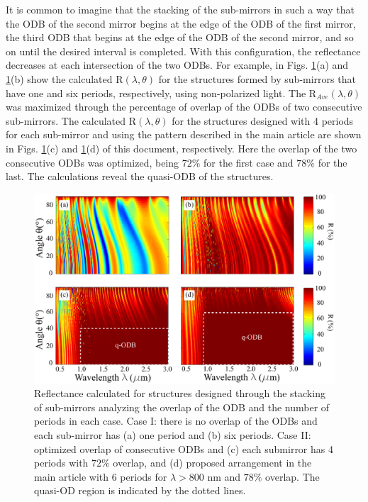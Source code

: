 \documentclass[a4paper,fleqn]{cas-sc}
\begin{document}
It is common to imagine that the stacking of the sub-mirrors in such a way that
the ODB of the second mirror begins at the edge of the ODB of the first mirror, the 
third ODB that begins at the edge of the ODB of the second mirror, and so on until 
the desired interval is completed. With this configuration, the reflectance 
decreases at each intersection of the two ODBs. For example, in Figs. \ref{Fig4}(a) 
and \ref{Fig4}(b) show the calculated R$(\lambda, \theta)$ for the structures formed 
by sub-mirrors that have one and six periods, respectively, using non-polarized 
light.  The R$_{Ave}(\lambda, \theta)$ was maximized through the percentage of 
overlap of the ODBs of two consecutive sub-mirrors.  
The 
calculated R$(\lambda, \theta)$ for the structures designed with 4 periods for each 
sub-mirror and using the pattern described in the main article are shown in Figs. 
\ref{Fig4}(c) and \ref{Fig4}(d) of this document, respectively. Here the overlap of 
the two consecutive ODBs was optimized, being $72\%$ for the first case and $78\%$ 
for the last. The calculations reveal the quasi-ODB of the structures.

\begin{figure}[!ht]
	\begin{center}
		\includegraphics[width=\textwidth]
		{FigureS3.pdf}
	\end{center}
	\caption{Reflectance calculated for structures designed through the stacking of 
		sub-mirrors analyzing the overlap of the ODB and the number of periods in 
		each case. 
		Case I: there is no overlap of the ODBs and each 
		sub-mirror has (a) one period and (b) six periods. Case II: optimized 
		overlap of consecutive ODBs and (c) each submirror has 4 periods with 
		$72\%$ overlap, and (d) proposed arrangement in the main article with 6 
		periods for $\lambda>800$ nm and $78\%$ overlap. The quasi-OD region is indicated by the dotted lines.
	}
	\label{Fig4}
\end{figure}
\end{document}
